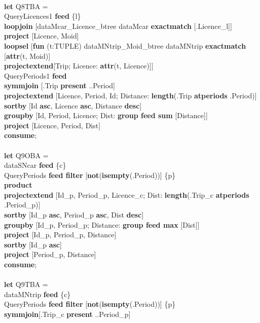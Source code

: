 \documentclass[a4paper]{article}
\newcommand{\op}[1]{\textbf{#1}}
\begin{document}
\begin{scriptsize}
\begin{tabbing}
\\
\op{let} Q8TBA =\\
\>QueryLicences1 \op{feed} \{l\}\\
\>\>\op{loopjoin} [dataMcar\_Licence\_btree dataMcar \op{exactmatch} [.Licence\_l]]\\
\>\>\op{project} [Licence, Moid]\\
\>\>\op{loopsel} [\op{fun} (t:TUPLE) dataMNtrip\_Moid\_btree dataMNtrip \op{exactmatch} [\op{attr}(t, Moid)]\\
\>\>\>\op{projectextend}[Trip; Licence: \op{attr}(t, Licence)]]\\
\>QueryPeriods1 \op{feed}\\
\>\op{symmjoin} [.Trip \op{present} ..Period]\\
\>\op{projectextend} [Licence, Period, Id; Distance: \op{length}(.Trip \op{atperiods} .Period)]\\
\>\op{sortby} [Id \op{asc}, Licence \op{asc}, Distance \op{desc}]\\
\>\op{groupby} [Id, Period, Licence; Dist: \op{group feed sum} [Distance]]\\
\>\op{project} [Licence, Period, Dist]\\
\op{consume};\\
\\
\op{let} Q9OBA =\\
\>dataSNcar \op{feed} \{c\}\\
\>QueryPeriods \op{feed filter} [\op{not}(\op{isempty}(.Period))] \{p\}\\
\>\op{product}\\
\>\op{projectextend} [Id\_p, Period\_p, Licence\_c; Dist: \op{length}(.Trip\_c \op{atperiods} .Period\_p)]\\
\>\op{sortby} [Id\_p \op{asc}, Period\_p \op{asc}, Dist \op{desc}]\\
\>\op{groupby} [Id\_p, Period\_p; Distance: \op{group feed max} [Dist]]\\
\>\op{project} [Id\_p, Period\_p, Distance]\\
\>\op{sortby} [Id\_p \op{asc}]\\
\>\op{project} [Period\_p, Distance]\\
\op{consume};\\
\\
\op{let} Q9TBA =\\
\>dataMNtrip \op{feed} \{c\}\\
\>QueryPeriods \op{feed filter} [\op{not}(\op{isempty}(.Period))] \{p\}\\
\>\op{symmjoin}[.Trip\_c \op{present} ..Period\_p]\\

\end{tabbing}
\end{scriptsize}
\end{document}
